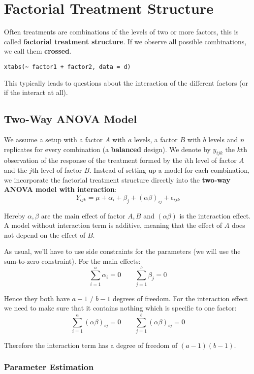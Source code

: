 \section{Factorial Treatment Structure}

Often treatments are combinations of the levels of two or more factors, this is called \textbf{factorial treatment structure}. If we observe all possible combinations, we call them \textbf{crossed}.

\begin{lstlisting}
xtabs(~ factor1 + factor2, data = d)
\end{lstlisting}

This typically leads to questions about the interaction of the different factors (or if the interact at all).


\subsection{Two-Way ANOVA Model}

We assume a setup with a factor $A$ with $a$ levels, a factor $B$ with $b$ levels and $n$ replicates for every combination (a \textbf{balanced} design). We denote by $y_{ijk}$ the $k$th observation of the response of the treatment formed by the $i$th level of factor $A$ and the $j$th level of factor $B$. Instead of setting up a model for each combination, we incorporate the factorial treatment structure directly into the \textbf{two-way ANOVA model with interaction}:
$$Y_{ijk} = \mu + \alpha_i + \beta_j + (\alpha \beta)_{ij} + \epsilon_{ijk}$$

Hereby $\alpha, \beta$ are the main effect of factor $A, B$ and $(\alpha \beta)$ is the interaction effect. A model without interaction term is additive, meaning that the effect of $A$ does not depend on the effect of $B$.\medskip

As usual, we'll have to use side constraints for the parameters (we will use the sum-to-zero constraint). For the main effects:
$$\sum_{i=1}^a \alpha_i = 0 \qquad \sum_{j=1}^b \beta_j = 0 $$

Hence they both have $a-1$ / $b-1$ degrees of freedom. For the interaction effect we need to make sure that it contains nothing which is specific to one factor:
$$\sum_{i=1}^a (\alpha \beta)_{ij} = 0 \qquad \sum_{j=1}^b (\alpha \beta)_{ij} = 0$$

Therefore the interaction term has a degree of freedom of $(a-1)(b-1)$.

\subsubsection{Parameter Estimation}

